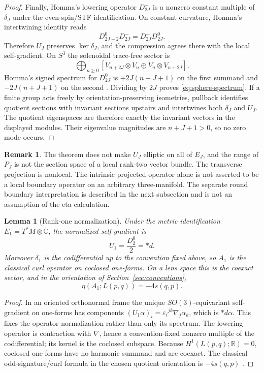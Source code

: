 \documentclass[11pt]{article}
\newtheorem{lemma}[theorem]{Lemma}
\theoremstyle{definition}
\newtheorem{remark}[theorem]{Remark}
\begin{document}
\begin{proof}
Finally, Homma's lowering operator $D^-_{2J}$ is a nonzero constant multiple
of $\delta_J$ under the even-spin/STF identification.  On constant
curvature, Homma's intertwining identity reads
\[
 D^0_{2J-2}D^-_{2J}=D^-_{2J}D^0_{2J}.
\]
Therefore $U_J$ preserves $\ker\delta_J$, and the compression agrees there
with the local self-gradient.  On $S^3$ the solenoidal trace-free sector is
\[
 \bigoplus_{n\geq0}
 \left[
 V_{n+2J}\otimes V_n
 \oplus
 V_n\otimes V_{n+2J}
 \right].
\]
Homma's signed spectrum for $D^0_{2J}$ is
$+2J(n+J+1)$ on the first summand and $-2J(n+J+1)$ on the second
\cite{Homma2001,HommaTomihisa2021}.  Dividing by $2J$ proves
\eqref{eq:sphere-spectrum}.  If a finite group acts freely by
orientation-preserving isometries, pullback identifies quotient sections
with invariant sections upstairs and intertwines both $\delta_J$ and $U_J$.
The quotient eigenspaces are therefore exactly the invariant vectors in the
displayed modules.  Their eigenvalue magnitudes are $n+J+1>0$, so no zero
mode occurs.
\end{proof}

\begin{remark}
The theorem does not make $U_J$ elliptic on all of $E_J$, and the range of
$P_J$ is not the section space of a local rank-two vector bundle.  The
transverse projection is nonlocal.  The intrinsic projected operator alone
is not asserted to be a local boundary operator on an arbitrary
three-manifold.  The separate round boundary interpretation is described in
the next subsection and is not an assumption of the eta calculation.
\end{remark}

\begin{lemma}[Rank-one normalization]
\label{lem:rank-one-normalization}
Under the metric identification $E_1=T^*M\otimes\mathbb C$, the normalized
self-gradient is
\[
 U_1=\frac{D^0_2}{2}=*d .
\]
Moreover $\delta_1$ is the codifferential up to the convention fixed above,
so $A_1$ is the classical curl operator on coclosed one-forms.  On a lens
space this is the coexact sector, and in the orientation of
Section~\ref{sec:conventions},
\[
 \eta(A_1;L(p,q))=-4s(q,p).
\]
\end{lemma}

\begin{proof}
In an oriented orthonormal frame the unique $SO(3)$-equivariant
self-gradient on one-forms has components
$(U_1\alpha)_i=\varepsilon_i{}^{jk}\nabla_j\alpha_k$, which is $*d\alpha$.
This fixes the operator normalization rather than only its spectrum.  The
lowering operator is contraction with $\nabla$, hence a
convention-fixed nonzero multiple of the codifferential; its kernel is the
coclosed subspace.  Because $H^1(L(p,q);\mathbb R)=0$, coclosed one-forms
have no harmonic summand and are coexact.  The classical
odd-signature/curl formula in the chosen quotient orientation is
$-4s(q,p)$ \cite{APS1975,Bar2019}.
\end{proof}
\end{document}
